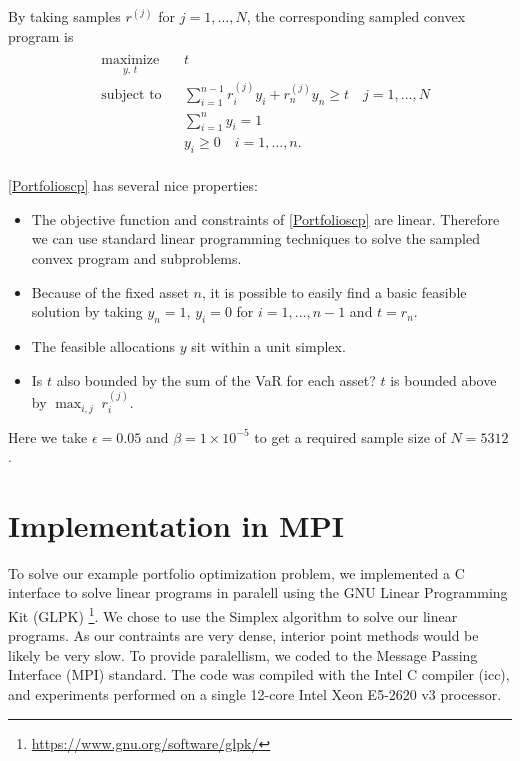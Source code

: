 \documentclass[12pt]{article}
\begin{document}
By taking samples $r^{(j)}$ for $j = 1, \ldots, N$, the corresponding sampled convex program is 
\begin{align}\label{Portfolioscp}
\begin{split}
\begin{aligned}
    & \underset{y, \,t}{\text{maximize}}
    & & t \\
    & \text{subject to}
    & & \sum_{i=1}^{n-1} r_i^{(j)} y_i + r_n^{(j)} y_n \geq t \quad j = 1, \ldots, N \\
    & & & \sum_{i=1}^n y_i = 1 \\
    & & & y_i \geq 0 \quad i = 1, \ldots, n.
\end{aligned}
\end{split} \tag{Portfolio SCP$_N$}
\end{align}


\ref{Portfolioscp} has several nice properties:
\begin{itemize}
\item The objective function and constraints of \ref{Portfolioscp} are linear. Therefore we can use standard linear programming techniques to solve the sampled convex program and subproblems.
\item Because of the fixed asset $n$, it is possible to easily find a basic feasible solution by taking $y_n = 1$, $y_i = 0$ for $i = 1, \ldots, n-1$ and $t = r_n$.
\item The feasible allocations $y$ sit within a unit simplex.
\item Is $t$ also bounded by the sum of the VaR for each asset?  $t$ is bounded above by $\max_{i, j} \; r_i^{(j)}$.
\end{itemize}

Here we take $\epsilon = 0.05$ and $\beta = 1 \times 10^{-5}$ to get a required sample size of $N = 5312$.

\section*{Implementation in MPI}

To solve our example portfolio optimization problem, we implemented a C interface to solve linear programs in paralell using the GNU Linear Programming Kit (GLPK) \footnote{\url{https://www.gnu.org/software/glpk/}}.
We chose to use the Simplex algorithm to solve our linear programs.  
As our contraints are very dense, interior point methods would be likely be very slow.
To provide paralellism, we coded to the Message Passing Interface (MPI) standard.
The code was compiled with the Intel C compiler (icc), and experiments performed on a single 12-core Intel Xeon E5-2620 v3 processor.
\end{document}
